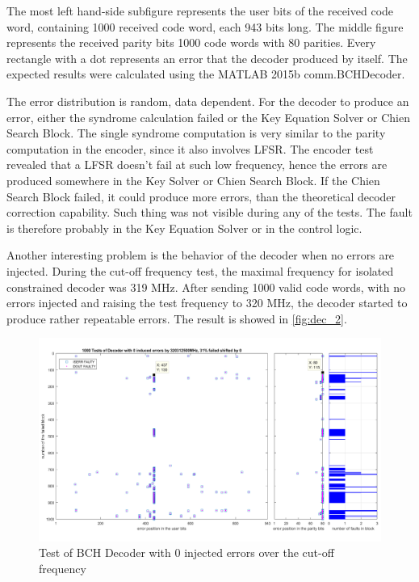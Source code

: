 The most left hand-side subfigure represents the user bits of the received code word, containing 1000 received code word, each 943 bits long. The middle figure represents the received parity bits 1000 code words with 80 parities. Every rectangle with a dot represents an error that the decoder produced by itself. The expected results were calculated using the MATLAB 2015b comm.BCHDecoder.

The error distribution is random, data dependent. For the decoder to produce an error, either the syndrome calculation failed or the Key Equation Solver or Chien Search Block. The single syndrome computation is very similar to the parity computation in the encoder, since it also involves LFSR. The encoder test revealed that a LFSR doesn't fail at such low frequency, hence the errors are produced somewhere in the Key Solver or Chien Search Block. If the Chien Search Block failed, it could produce more errors, than the theoretical decoder correction capability. Such thing was not visible during any of the tests. The fault is therefore probably in the Key Equation Solver or in the control logic.

Another interesting problem is the behavior of the decoder when no errors are injected. During the cut-off frequency test, the maximal frequency for isolated constrained decoder was 319 MHz. After sending 1000 valid code words, with no errors injected and raising the test frequency to 320 MHz, the decoder started to produce rather repeatable errors. The result is showed in \autoref{fig:dec_2}.

\begin{figure}[h]
\centering
\includegraphics[width=\textwidth]{figures/Test_DDEC_0_fault_1000_320_MHz.png}
\caption{Test of BCH Decoder with 0 injected errors over the cut-off frequency}
\label{fig:dec_2}
\end{figure}


